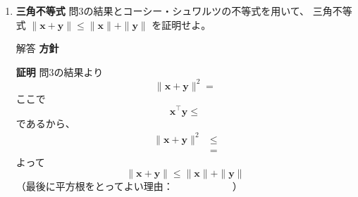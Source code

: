 \documentclass[a4paper,dvipdfmx]{jsarticle}
\newcommand{\学籍番号}{0000000}
\newcommand{\氏名}{氏名を書く}
\newcommand{\提出日}{2026年10月8日}
\newenvironment{answer}{\begin{itembox}[l]{解答}}{\end{itembox}}
\begin{document}
\begin{enumerate}
\begin{answer}
      \medskip
      \textbf{後半の証明}\quad
      $\bm{x} \perp \bm{y}$ とは
      \begin{equation*}
        \phantom{XXXXXXXXXXXXXX}
      \end{equation*}
      であるから、
      \begin{equation*}
        \|\bm{x} + \bm{y}\|^2 =
      \end{equation*}
    \end{answer}

  \item \textbf{三角不等式}\quad
    問3の結果とコーシー・シュワルツの不等式を用いて、
    三角不等式 $\|\bm{x} + \bm{y}\| \leq \|\bm{x}\| + \|\bm{y}\|$ を証明せよ。
    \begin{answer}
      \textbf{方針}\quad

      \medskip
      \textbf{証明}\quad
      問3の結果より
      \begin{equation*}
        \|\bm{x} + \bm{y}\|^2 =
      \end{equation*}
      ここで
      \begin{equation*}
        \bm{x}^\top \bm{y} \leq
      \end{equation*}
      であるから、
      \begin{align*}
        \|\bm{x} + \bm{y}\|^2 &\leq \\
                              &=
      \end{align*}
      よって
      \begin{equation*}
        \|\bm{x} + \bm{y}\| \leq \|\bm{x}\| + \|\bm{y}\|
      \end{equation*}
      （最後に平方根をとってよい理由：　　　　　　）
    \end{answer}


\end{enumerate}
\end{document}
